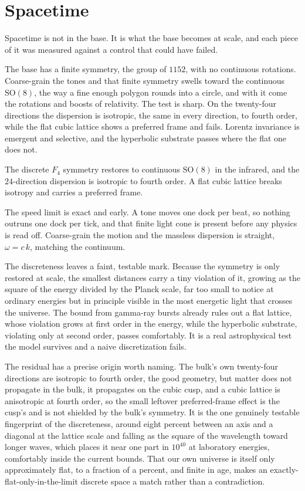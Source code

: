 \section{Spacetime}

Spacetime is not in the base. It is what the base becomes at scale, and each piece of it was measured against a control that could have failed. \cite{pollard2026vibetest}

The base has a finite symmetry, the group of $1152$, with no continuous rotations. Coarse-grain the tones and that finite symmetry swells toward the continuous $\mathrm{SO}(8)$, the way a fine enough polygon rounds into a circle, and with it come the rotations and boosts of relativity. The test is sharp. On the twenty-four directions the dispersion is isotropic, the same in every direction, to fourth order, while the flat cubic lattice shows a preferred frame and fails. Lorentz invariance is emergent and selective, and the hyperbolic substrate passes where the flat one does not.

\begin{result}
The discrete $F_4$ symmetry restores to continuous $\mathrm{SO}(8)$ in the infrared, and the $24$-direction dispersion is isotropic to fourth order. A flat cubic lattice breaks isotropy and carries a preferred frame. \cite{pollard2026vibetest}
\end{result}

The speed limit is exact and early. A tone moves one dock per beat, so nothing outruns one dock per tick, and that finite light cone is present before any physics is read off. Coarse-grain the motion and the massless dispersion is straight, $\omega = c\,k$, matching the continuum.

The discreteness leaves a faint, testable mark. Because the symmetry is only restored at scale, the smallest distances carry a tiny violation of it, growing as the square of the energy divided by the Planck scale, far too small to notice at ordinary energies but in principle visible in the most energetic light that crosses the universe. The bound from gamma-ray bursts already rules out a flat lattice, whose violation grows at first order in the energy, while the hyperbolic substrate, violating only at second order, passes comfortably. It is a real astrophysical test the model survives and a naive discretization fails.

The residual has a precise origin worth naming. The bulk's own twenty-four directions are isotropic to fourth order, the good geometry, but matter does not propagate in the bulk, it propagates on the cubic cusp, and a cubic lattice is anisotropic at fourth order, so the small leftover preferred-frame effect is the cusp's and is not shielded by the bulk's symmetry. It is the one genuinely testable fingerprint of the discreteness, around eight percent between an axis and a diagonal at the lattice scale and falling as the square of the wavelength toward longer waves, which places it near one part in $10^{40}$ at laboratory energies, comfortably inside the current bounds. That our own universe is itself only approximately flat, to a fraction of a percent, and finite in age, makes an exactly-flat-only-in-the-limit discrete space a match rather than a contradiction.

